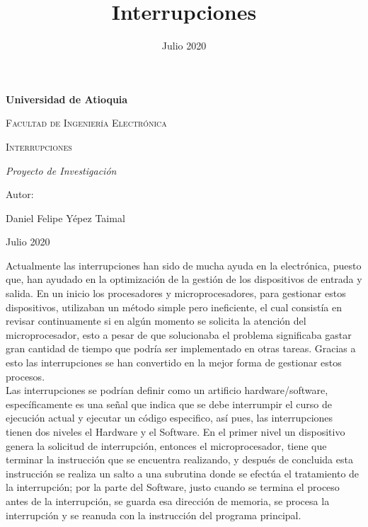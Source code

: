 \documentclass{article}
\title{Interrupciones}
\date{Julio 2020}
\begin{document}
\begin{titlepage}
\centering
{\bfseries\LARGE Universidad de Atioquia\par}
\vspace{1cm}
{\scshape\Large Facultad de Ingenier\'ia Electr\'onica \par}
\vspace{3cm}
{\scshape\Huge Interrupciones \par}
\vspace{3cm}
{\itshape\Large Proyecto de Investigaci\'on \par}
\vfill
{\Large Autor: \par}
{\Large Daniel Felipe Y\'epez Taimal \par}
\vfill
{\Large Julio 2020 \par}
\end{titlepage}

\maketitle

Actualmente las interrupciones han sido de mucha ayuda en la electrónica, puesto que, han ayudado en la optimización de la gestión de los dispositivos de entrada y salida. En un inicio los procesadores y microprocesadores, para gestionar estos dispositivos, utilizaban un método simple pero ineficiente, el cual consistía en revisar continuamente si en algún momento se solicita la atención del microprocesador, esto a pesar de que solucionaba el problema significaba gastar gran cantidad de tiempo que podría ser implementado en otras tareas. Gracias a esto las interrupciones se han convertido en la mejor forma de gestionar estos procesos.\\

Las interrupciones se podrían definir como un artificio hardware/software, específicamente es una señal que indica que se debe interrumpir el curso de ejecución actual y ejecutar un código especifico, así pues, las interrupciones tienen dos niveles el Hardware y el Software. En el primer nivel un dispositivo genera la solicitud de interrupción, entonces el microprocesador, tiene que terminar la instrucción que se encuentra realizando, y después de concluida esta instrucción se realiza un salto a una subrutina donde se efectúa el tratamiento de la interrupción; por la parte del Software, justo cuando se termina el proceso antes de la interrupción, se guarda esa dirección de memoria, se procesa la interrupción y se reanuda con la instrucción del programa principal.\\
\end{document}
